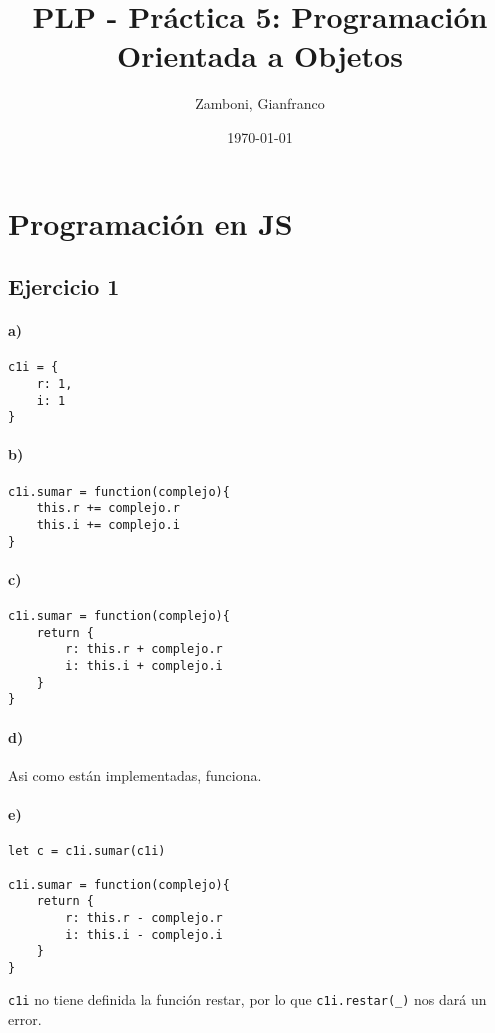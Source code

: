 \documentclass[10pt,a4paper]{article}
\begin{document}
\title{PLP - Práctica 5: Programación Orientada a Objetos}
%
\date{\today}
%
\author{Zamboni, Gianfranco}
%
\maketitle
\setcounter{page}{1}
%
\section*{Programación en JS}
\subsection{Ejercicio 1}
\paragraph{a)}
\begin{centrado}
\begin{verbatim}
c1i = {
    r: 1,
    i: 1
}
\end{verbatim}
\end{centrado}
\paragraph{b)}
\begin{centrado}
\begin{verbatim}
c1i.sumar = function(complejo){
    this.r += complejo.r
    this.i += complejo.i
}
\end{verbatim}
\end{centrado}
\paragraph{c)}
\begin{centrado}
\begin{verbatim}
c1i.sumar = function(complejo){
    return {
        r: this.r + complejo.r
        i: this.i + complejo.i
    }
}
\end{verbatim}
\end{centrado}

\paragraph{d)} Asi como están implementadas, funciona.
\paragraph{e)}
\begin{centrado}
\begin{verbatim}
let c = c1i.sumar(c1i)

c1i.sumar = function(complejo){
    return {
        r: this.r - complejo.r
        i: this.i - complejo.i
    }
}
\end{verbatim}
\end{centrado}
\texttt{c1i} no tiene definida la función restar, por lo que \texttt{c1i.restar(\_)} nos dará un error.
\end{document}
